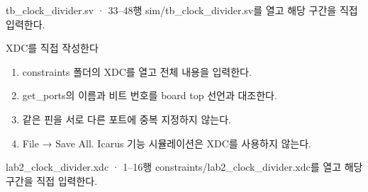 \begin{frame}{tb\_clock\_divider.sv · 33–48행}
\small
sim/tb\_clock\_divider.sv를 열고 해당 구간을 직접 입력한다.\par\vspace{0.4cm}\par\vspace{0.4cm}
\end{frame}

\begin{frame}{XDC를 직접 작성한다}
\small
\begin{enumerate}
\item constraints 폴더의 XDC를 열고 전체 내용을 입력한다.
\item get\_ports의 이름과 비트 번호를 board top 선언과 대조한다.
\item 같은 핀을 서로 다른 포트에 중복 지정하지 않는다.
\item File → Save All. Icarus 기능 시뮬레이션은 XDC를 사용하지 않는다.
\end{enumerate}
\end{frame}

\begin{frame}{lab2\_clock\_divider.xdc · 1–16행}
\small
constraints/lab2\_clock\_divider.xdc를 열고 해당 구간을 직접 입력한다.\par\vspace{0.4cm}\par\vspace{0.4cm}
\end{frame}

